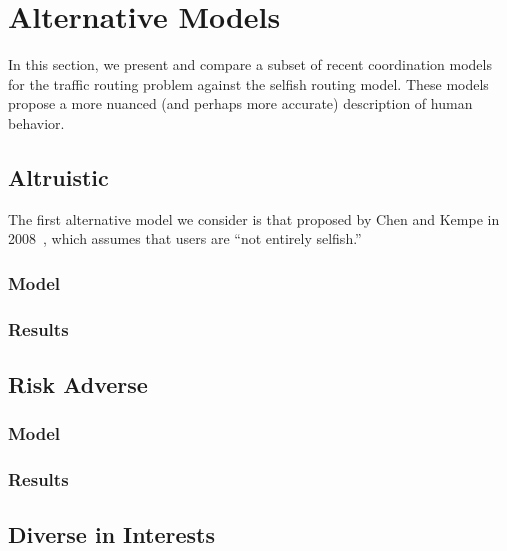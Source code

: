 \documentclass[acmlarge]{acmart}
\begin{document}
\section{Alternative Models}
In this section, we present and compare a subset of recent coordination models for the traffic routing problem against the selfish routing model. These models propose a more nuanced (and perhaps more accurate) description of human behavior.

\subsection{Altruistic}
The first alternative model we consider is that proposed by Chen and Kempe in 2008~\cite{chen}, which assumes that users are ``not entirely selfish.''

\subsubsection{Model}
\subsubsection{Results}

\subsection{Risk Adverse}
\subsubsection{Model}
\subsubsection{Results}

\subsection{Diverse in Interests}
\end{document}
